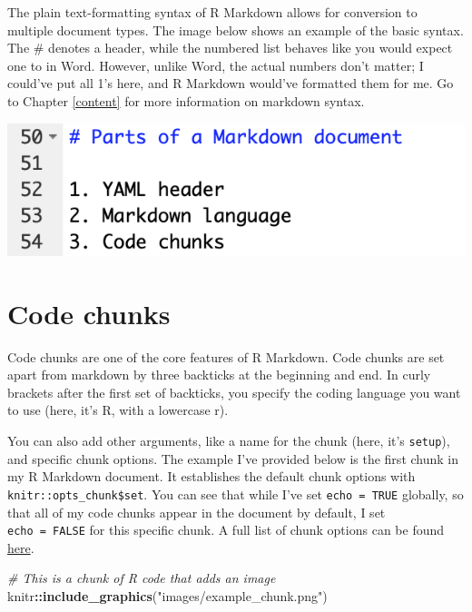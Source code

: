\documentclass[
  openany]{book}
\newenvironment{Shaded}{\begin{snugshade}}{\end{snugshade}}
\newcommand{\CommentTok}[1]{\textcolor[rgb]{0.56,0.35,0.01}{\textit{#1}}}
\newcommand{\KeywordTok}[1]{\textcolor[rgb]{0.13,0.29,0.53}{\textbf{#1}}}
\newcommand{\NormalTok}[1]{#1}
\newcommand{\OperatorTok}[1]{\textcolor[rgb]{0.81,0.36,0.00}{\textbf{#1}}}
\newcommand{\StringTok}[1]{\textcolor[rgb]{0.31,0.60,0.02}{#1}}
\begin{document}
The plain text-formatting syntax of R Markdown allows for conversion to multiple document types. The image below shows an example of the basic syntax. The \# denotes a header, while the numbered list behaves like you would expect one to in Word. However, unlike Word, the actual numbers don't matter; I could've put all 1's here, and R Markdown would've formatted them for me. Go to Chapter \ref{content} for more information on markdown syntax.

\includegraphics[width=\textwidth]{images/example_markdown}

\hypertarget{chunkex}{%
\section{Code chunks}\label{chunkex}}

Code chunks are one of the core features of R Markdown. Code chunks are set apart from markdown by three backticks at the beginning and end. In curly brackets after the first set of backticks, you specify the coding language you want to use (here, it's R, with a lowercase r).

You can also add other arguments, like a name for the chunk (here, it's \texttt{setup}), and specific chunk options. The example I've provided below is the first chunk in my R Markdown document. It establishes the default chunk options with \texttt{knitr::opts\_chunk\$set}. You can see that while I've set \texttt{echo\ =\ TRUE} globally, so that all of my code chunks appear in the document by default, I set \texttt{echo\ =\ FALSE} for this specific chunk. A full list of chunk options can be found \href{https://rstudio.com/wp-content/uploads/2015/03/rmarkdown-reference.pdf}{here}.

\begin{Shaded}
\begin{Highlighting}[]
\CommentTok{# This is a chunk of R code that adds an image}
\NormalTok{knitr}\OperatorTok{::}\KeywordTok{include_graphics}\NormalTok{(}\StringTok{"images/example_chunk.png"}\NormalTok{)}
\end{Highlighting}
\end{Shaded}
\end{document}
